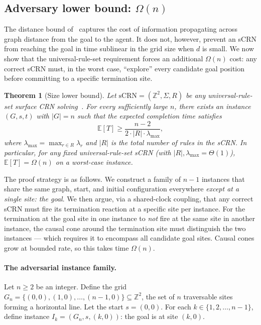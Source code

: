 \documentclass[11pt]{article}
\theoremstyle{plain}
\newtheorem{theorem}{Theorem}
\theoremstyle{definition}
\theoremstyle{remark}
\newcommand{\Z}{\mathbb{Z}}
\newcommand{\sCRN}{\text{sCRN}}
\begin{document}
\subsection{Adversary lower bound: \texorpdfstring{$\Omega(n)$}{Ω(n)}}
\label{subsec:lower-n}

The distance bound of~ captures the cost of information propagating across graph distance from the goal to the agent. It does not, however, prevent an sCRN from reaching the goal in time sublinear in the grid size when $d$ is small. We now show that the universal-rule-set requirement forces an additional $\Omega(n)$ cost: any correct sCRN must, in the worst case, ``explore'' every candidate goal position before committing to a specific termination site.

\begin{theorem}[Size lower bound]
\label{thm:lower-n}
Let $\sCRN = (\Z^2, \Sigma, R)$ be any universal-rule-set surface CRN solving~. For every sufficiently large $n$, there exists an instance $(G, s, t)$ with $|G| = n$ such that the expected completion time satisfies
\[
\mathbb{E}[T] \geq \frac{n - 2}{2 \cdot |R| \cdot \lambda_{\max}},
\]
where $\lambda_{\max} = \max_{r \in R} \lambda_r$ and $|R|$ is the total number of rules in the sCRN. In particular, for any fixed universal-rule-set sCRN (with $|R|, \lambda_{\max} = \Theta(1)$), $\mathbb{E}[T] = \Omega(n)$ on a worst-case instance.
\end{theorem}

The proof strategy is as follows. We construct a family of $n - 1$ instances that share the same graph, start, and initial configuration everywhere \emph{except at a single site: the goal}. We then argue, via a shared-clock coupling, that any correct sCRN must fire its termination reaction at a specific site per instance. For the termination at the goal site in one instance to \emph{not} fire at the same site in another instance, the causal cone around the termination site must distinguish the two instances — which requires it to encompass all candidate goal sites. Causal cones grow at bounded rate, so this takes time $\Omega(n)$.

\paragraph{The adversarial instance family.}
Let $n \geq 2$ be an integer. Define the grid $G_n = \{(0, 0), (1, 0), \ldots, (n-1, 0)\} \subseteq \Z^2$, the set of $n$ traversable sites forming a horizontal line. Let the start $s = (0, 0)$. For each $k \in \{1, 2, \ldots, n-1\}$, define instance $I_k = (G_n, s, (k, 0))$: the goal is at site $(k, 0)$.
\end{document}

